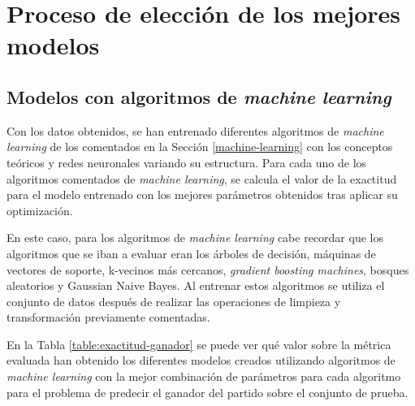 \section{Proceso de elección de los mejores modelos}
\subsection{Modelos con algoritmos de \textit{machine learning}}
Con los datos obtenidos, se han entrenado diferentes algoritmos de \textit{machine learning} de los comentados en la Sección \ref{machine-learning} con los conceptos teóricos y redes neuronales variando su estructura. Para cada uno de los algoritmos comentados de \textit{machine learning}, se calcula el valor de la exactitud para el modelo entrenado con los mejores parámetros obtenidos tras aplicar su optimización.

En este caso, para los algoritmos de \textit{machine learning} cabe recordar que los algoritmos que se iban a evaluar eran los árboles de decisión, máquinas de vectores de soporte, k-vecinos más cercanos, \textit{gradient boosting machines}, bosques aleatorios y Gaussian Naive Bayes. Al entrenar estos algoritmos se utiliza el conjunto de datos después de realizar las operaciones de limpieza y transformación previamente comentadas.








En la Tabla \ref{table:exactitud-ganador} se puede ver qué valor sobre la métrica evaluada han obtenido los diferentes modelos creados utilizando algoritmos de \textit{machine learning} con la mejor combinación de parámetros para cada algoritmo para el problema de predecir el ganador del partido sobre el conjunto de prueba.




